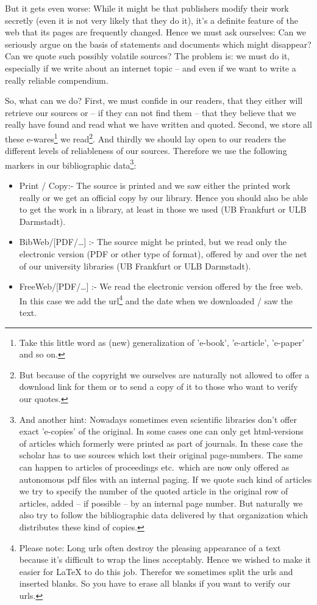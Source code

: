 But it gets even worse: While it might be that publishers modify their work
secretly (even it is not very likely that they do it), it's a definite feature
of the web that its pages are fre\-quen\-tly changed. Hence we must ask
ourselves: Can we seriously argue on the basis of statements and documents which
might disappear? Can we quote such possibly volatile sources? The problem is: we
must do it, especially if we write about an internet topic -- and even if we want
to write a really reliable compendium.

So, what can we do? First, we must confide in our readers, that they either
will retrieve our sources or -- if they can not find them -- that they
believe that we really have found and read what we have written and
quoted. Second, we store all these e-wares\footnote{Take this little word as
(new) generalization of 'e-book', 'e-article', 'e-paper' and so on.} we
read\footnote{But because of the copyright we ourselves are naturally not
allowed to offer a download link for them or to send a copy of it to those who
want to verify our quotes.}. And thirdly we should lay open to our readers the
different levels of reliableness of our sources. Therefore we use
the following markers in our bibliographic data\footnote{And another hint: Nowadays sometimes
even scientific libraries don't offer exact 'e-copies' of the original. In
some cases one can only get html-versions of articles which formerly were
printed as part of journals. In these case the scholar has to use sources which
lost their original page-numbers. The same can happen to articles of proceedings
etc.\ which are now only offered as autonomous pdf files with an internal paging.
If we quote such kind of articles we try to specify the number of the quoted
article in the original row of articles, added -- if possible -- by an internal
page number. But naturally we also try to follow the bibliographic data
delivered by that organization which distributes these kind of copies.}:

\begin{itemize}
  \item Print / Copy:- The source is printed and we saw either the printed work
  really or we get an official copy by our library. Hence you should also be able
  to get the work in a library, at least in those we used (UB Frankfurt or ULB
  Darmstadt).
  \item BibWeb/[PDF/\ldots] :- The source might be printed, but we read only the
  electronic version (PDF or other type of format), offered by and over the
  net of our university libraries (UB Frankfurt or ULB Darmstadt).
  \item FreeWeb/[PDF/\ldots] :- We read the electronic version offered by the
  free web. In this case we add the url\footnote{Please note: Long urls often
  destroy the pleasing appearance of a text because it's difficult to wrap the
  lines acceptably. Hence we wished to make it easier for LaTeX to do this job.
  Therefor we sometimes split the urls and inserted blanks. So you have to erase
  all blanks if you want to verify our urls.} and the date when we downloaded /
  saw the text.
\end{itemize}


%
